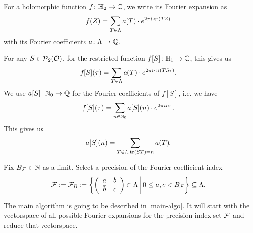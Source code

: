 \begin{remark}
\label{remark:restricted-by-S}
For a holomorphic function $f \colon \mathbb{H}_2 \rightarrow \mathbb{C}$, we write its Fourier expansion as
\[ f(Z) = \sum_{T \in \Lambda} a(T) \cdot e^{2 \pi i \cdot \textup{\textrm{tr}}(T Z)} \]
with its Fourier coefficients $a \colon \Lambda \rightarrow \mathbb{Q}$.

For any $S \in \operatorname{\mathcal{P}}_2(\mathcal{O})$, for the restricted function $f[S] \colon \mathbb{H}_1 \rightarrow \mathbb{C}$, this gives us
\[ f[S](\tau) = \sum_{T \in \Lambda} a(T) \cdot e^{2 \pi i \cdot \textup{\textrm{tr}}(T S \tau)} . \]
We use $a[S] \colon \mathbb{N}_0 \rightarrow \mathbb{Q}$ for the Fourier coefficients of $f[S]$, i.e. we have
\[ f[S](\tau) = \sum_{n \in \mathbb{N}_0} a[S](n) \cdot e^{2 \pi i n \tau} . \]
This gives us
\[ a[S] (n) = \sum_{T \in \Lambda, \textup{\textrm{tr}}(S T) = n} a(T) . \]

Fix $B_{\mathcal{F}} \in \mathbb{N}$ as a limit. Select a precision of the Fourier coefficient index
\[ \F := \F_B := \Set{\SimpleMatrix{a}{b}{\overline b}{c} \in \Lambda}{0 \le a , c < B_{\F}} \subseteq \Lambda . \]
\end{remark}

The main algorithm is going to be described in \ref{main-algo}. It will start with the vectorspace of all possible Fourier expansions for the precision index set $\mathcal{F}$ and reduce that vectorspace.

